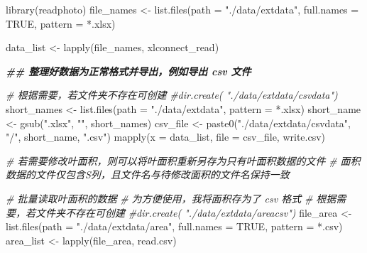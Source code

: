 \documentclass[
]{krantz}
\makeatletter
\newenvironment{Shaded}{\begin{snugshade}}{\end{snugshade}}
\newcommand{\AttributeTok}[1]{\textcolor[rgb]{0.77,0.63,0.00}{#1}}
\newcommand{\CommentTok}[1]{\textcolor[rgb]{0.56,0.35,0.01}{\textit{#1}}}
\newcommand{\ConstantTok}[1]{\textcolor[rgb]{0.00,0.00,0.00}{#1}}
\newcommand{\DocumentationTok}[1]{\textcolor[rgb]{0.56,0.35,0.01}{\textbf{\textit{#1}}}}
\newcommand{\FunctionTok}[1]{\textcolor[rgb]{0.00,0.00,0.00}{#1}}
\newcommand{\NormalTok}[1]{#1}
\newcommand{\OtherTok}[1]{\textcolor[rgb]{0.56,0.35,0.01}{#1}}
\newcommand{\StringTok}[1]{\textcolor[rgb]{0.31,0.60,0.02}{#1}}
\newenvironment{kframe}{%
\medskip{}
\setlength{\fboxsep}{.8em}
 \def\at@end@of@kframe{}%
 \ifinner\ifhmode%
  \def\at@end@of@kframe{\end{minipage}}%
  \begin{minipage}{\columnwidth}%
 \fi\fi%
 \def\FrameCommand##1{\hskip\@totalleftmargin \hskip-\fboxsep
 \colorbox{shadecolor}{##1}\hskip-\fboxsep
     \hskip-\linewidth \hskip-\@totalleftmargin \hskip\columnwidth}%
 \MakeFramed {\advance\hsize-\width
   \@totalleftmargin\z@ \linewidth\hsize
   \@setminipage}}%
 {\par\unskip\endMakeFramed%
 \at@end@of@kframe}
\renewenvironment{Shaded}{\begin{kframe}}{\end{kframe}}
\makeatother
\begin{document}
\begin{Shaded}
\begin{Highlighting}[]
\FunctionTok{library}\NormalTok{(readphoto)}
\NormalTok{file\_names }\OtherTok{\textless{}{-}}
  \FunctionTok{list.files}\NormalTok{(}\AttributeTok{path =} \StringTok{"./data/extdata"}\NormalTok{,}
             \AttributeTok{full.names =} \ConstantTok{TRUE}\NormalTok{,}
             \AttributeTok{pattern =} \StringTok{\textquotesingle{}*.xlsx\textquotesingle{}}\NormalTok{)}

\NormalTok{data\_list }\OtherTok{\textless{}{-}} \FunctionTok{lapply}\NormalTok{(file\_names, xlconnect\_read)}

\DocumentationTok{\#\# 整理好数据为正常格式并导出，例如导出 csv 文件}

\CommentTok{\# 根据需要，若文件夹不存在可创建}
\CommentTok{\#dir.create( "./data/extdata/csvdata")}
\NormalTok{short\_names }\OtherTok{\textless{}{-}}
  \FunctionTok{list.files}\NormalTok{(}\AttributeTok{path =} \StringTok{"./data/extdata"}\NormalTok{, }\AttributeTok{pattern =} \StringTok{\textquotesingle{}*.xlsx\textquotesingle{}}\NormalTok{)}
\NormalTok{short\_name }\OtherTok{\textless{}{-}} \FunctionTok{gsub}\NormalTok{(}\StringTok{".xlsx"}\NormalTok{, }\StringTok{""}\NormalTok{, short\_names)}
\NormalTok{csv\_file }\OtherTok{\textless{}{-}}
  \FunctionTok{paste0}\NormalTok{(}\StringTok{"./data/extdata/csvdata"}\NormalTok{, }\StringTok{"/"}\NormalTok{, short\_name, }\StringTok{".csv"}\NormalTok{)}
\FunctionTok{mapply}\NormalTok{(}\AttributeTok{x =}\NormalTok{ data\_list, }\AttributeTok{file =}\NormalTok{ csv\_file, write.csv)}



\CommentTok{\# 若需要修改叶面积，则可以将叶面积重新另存为只有叶面积数据的文件}
\CommentTok{\# 面积数据的文件仅包含S列，且文件名与待修改面积的文件名保持一致}


\CommentTok{\# 批量读取叶面积的数据}
\CommentTok{\# 为方便使用，我将面积存为了 csv 格式}
\CommentTok{\# 根据需要，若文件夹不存在可创建}
\CommentTok{\#dir.create( "./data/extdata/areacsv")}
\NormalTok{file\_area }\OtherTok{\textless{}{-}}
  \FunctionTok{list.files}\NormalTok{(}\AttributeTok{path =} \StringTok{"./data/extdata/area"}\NormalTok{,}
             \AttributeTok{full.names =} \ConstantTok{TRUE}\NormalTok{,}
             \AttributeTok{pattern =} \StringTok{\textquotesingle{}*.csv\textquotesingle{}}\NormalTok{)}
\NormalTok{area\_list }\OtherTok{\textless{}{-}} \FunctionTok{lapply}\NormalTok{(file\_area, read.csv)}


\end{Highlighting}
\end{Shaded}
\end{document}
